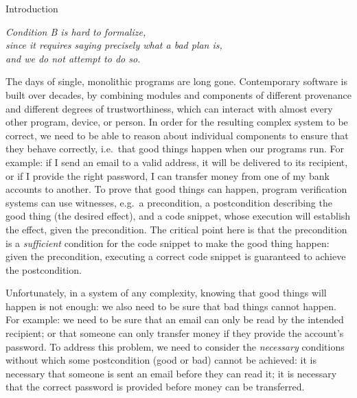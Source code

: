\renewcommand{\sophia}[2][]{\ponders{Sophia}{blue}{#1} \textcolor{blue}{#2}\xspace}
\renewcommand{\sophia}[2][]

\section{Introduction}
\label{s:intro}


\begin{flushright}
  \textit{Condition B is hard to formalize, \\since it requires saying precisely what a bad
plan is,\\ and we do not attempt to do so.}\\
 \cite{byzantine}
\end{flushright}

The days of single, monolithic programs are long gone.  Contemporary
software is built over decades, by combining modules and components of
different provenance and different degrees of trustworthiness, which can
interact with almost every other program, device, or person.
In order for the resulting complex system to be correct, we need to be
able to reason about individual components to ensure that they behave
correctly, i.e.\ that good things happen when our programs run.
For example: if I send an email to a valid address, it will be
delivered to its recipient, or if I provide the right password, I can
transfer money from one of my bank accounts to another. 
To prove that good things can
happen, program verification systems can use witnesses, e.g.\ a
precondition, a postcondition describing the good thing (the desired
effect), and a code snippet, whose execution will establish the
effect, given the precondition.  The critical point here is that the
precondition is a \emph{sufficient} condition for the code snippet to
make the good thing happen: given the precondition, executing a
correct code snippet is guaranteed to achieve the postcondition.

Unfortunately, in a system of any complexity, knowing that good things
will happen is not enough: we also need to be sure that bad things
cannot happen. For example: we  need to be sure that an email can
only be read by the intended recipient; or that someone can only transfer
money if they provide the account's password. To address this problem,
we need to consider the \emph{necessary} conditions without which some
postcondition (good or bad) cannot be achieved:
it is necessary that someone is sent an email before they can read it;
it is necessary that the correct password is provided before money can
be transferred.

